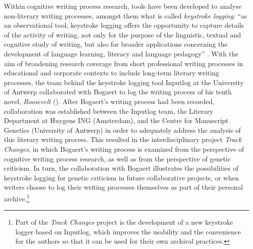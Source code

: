 \begin{paper}
Within cognitive writing process research, tools have been developed to
analyse non-literary writing processes, amongst them what is called
\emph{keystroke logging}: ``as an observational tool, keystroke logging
offers the opportunity to capture details of the activity of writing,
not only for the purpose of the linguistic, textual and cognitive study
of writing, but also for broader applications concerning the development
of language learning, literacy and language pedagogy'' \citep[1]{miller_keystroke_2006}. With the aim of broadening research coverage from
short professional writing processes in educational and corporate
contexts to include long-term literary writing processes, the team
behind the keystroke logging tool Inputlog \citep{leijten_keystroke_2013}
at the University of Antwerp collaborated with Bogaert to log the
writing process of his tenth novel, \emph{Roosevelt} (\citeyear{bogaert_roosevelt_2016}). After
Bogaert's writing process had been recorded, collaboration was
established between the Inputlog team, the Literary Department at
Huygens ING (Amsterdam), and the Centre for Manuscript Genetics
(University of Antwerp) in order to adequately address the analysis of
this literary writing process. This resulted in the interdisciplinary
project \emph{Track Changes}, in which Bogaert's writing process is
examined from the perspective of cognitive writing process research, as well as from
the perspective of genetic criticism. In turn, the collaboration with Bogaert
illustrates the possibilities of keystroke logging for genetic criticism
in future collaborative projects, or when writers choose to log their
writing processes themselves as part of their personal
archive.\footnote{Part of the \emph{Track Changes} project is the
  development of a new keystroke logger based on Inputlog, which improves the usability and the convenience for the authors so that it can be used for their own archival practices.}


\end{paper}
